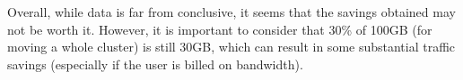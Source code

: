 \documentclass{acm_proc_article-sp}
\begin{document}
Overall, while data is far from conclusive, it seems that the savings obtained may not be worth it.  However, it is important to consider that 30\% of 100GB (for moving a whole cluster) is still 30GB, which can result in some substantial traffic savings (especially if the user is billed on bandwidth).




\end{document}
